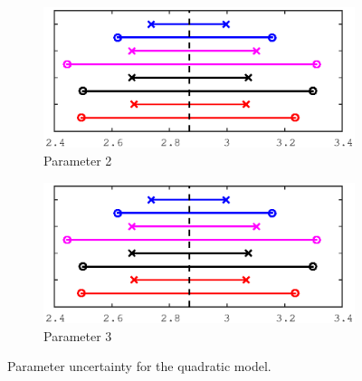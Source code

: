\documentclass[11pt,a4paper,oneside]{report}
\begin{document}
\begin{figure}[H]
  \begin{subfigure}[b]{0.5\textwidth}
    \includegraphics[width=\textwidth, trim=0 0 0 0,clip=true]{figures/task5/uncert_model2_param2.eps}
    \caption{Parameter 2}
  \end{subfigure}%
  \begin{subfigure}[b]{0.5\textwidth}
    \includegraphics[width=\textwidth, trim=0 0 0 0,clip=true]{figures/task5/uncert_model2_param2.eps}
    \caption{Parameter 3}
  \end{subfigure}%
  
  \caption{Parameter uncertainty for the quadratic model.}
  \label{fig:c5uncertM1}
  
\end{figure}
\end{document}
